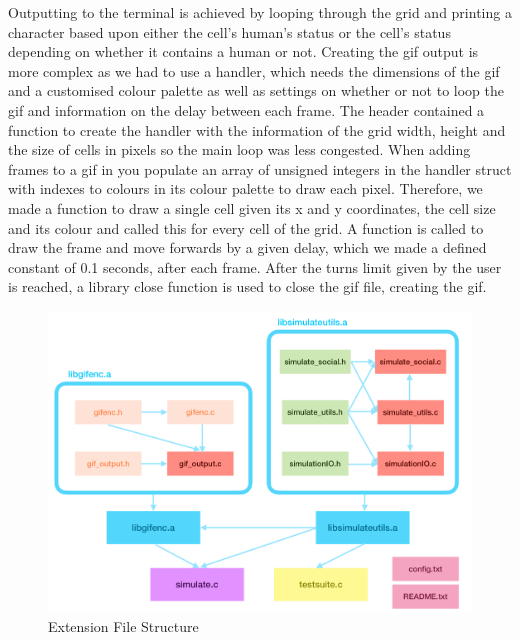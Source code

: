 \documentclass[11pt]{article}
\begin{document}
\par Outputting to the terminal is achieved by looping through the grid and printing a character based upon either the cell’s human’s status or the cell’s status depending on whether it contains a human or not. 
Creating the gif output is more complex as we had to use a  handler, which needs the dimensions of the gif and a customised colour palette as well as settings on whether or not to loop the gif and information on the delay between each frame. 
The  header contained a function to create the handler with the information of the grid width, height and the size of cells in pixels so the main loop was less congested. 
When adding frames to a gif in  you populate an array of unsigned integers in the  handler struct with indexes to colours in its colour palette to draw each pixel. 
Therefore, we made a  function to draw a single cell given its x and y coordinates, the cell size and its colour and called this for every cell of the grid.
A  function is called to draw the frame and move forwards by a given delay, which we made a defined constant of 0.1 seconds, after each frame. 
After the turns limit given by the user is reached, a  library close function is used to close the gif file, creating the gif.

\begin{figure}[t]
    \centering
    \includegraphics[scale=0.1]{images/extension_structure.jpeg}
    \caption{Extension File Structure}
    \label{Figure 2}
\end{figure}
\end{document}
